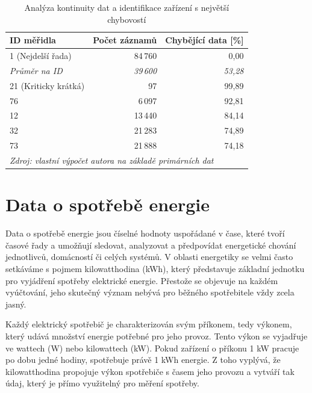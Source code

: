 \begin{table}[htbp]
\centering
\caption{Analýza kontinuity dat a identifikace zařízení s největší chybovostí}
\label{tab:vypadky_dat}
\begin{tabular}{@{}lrr@{}}
\toprule
\textbf{ID měřidla} & \textbf{Počet záznamů} & \textbf{Chybějící data [\%]} \\ \midrule
1 (Nejdelší řada)   & 84\,760               & 0,00                         \\
\textit{Průměr na ID} & \textit{39\,600}      & \textit{53,28}               \\ \midrule
21 (Kriticky krátká)& 97                    & 99,89                        \\
76                  & 6\,097                & 92,81                        \\
12                  & 13\,440               & 84,14                        \\
32                  & 21\,283               & 74,89                        \\
73                  & 21\,888               & 74,18                        \\ \bottomrule
\multicolumn{3}{l}{\textit{Zdroj: vlastní výpočet autora na základě primárních dat}}
\end{tabular}
\end{table}

\section{Data o spotřebě energie}
Data o spotřebě energie jsou číselné hodnoty uspořádané v čase, které tvoří časové řady a umožňují sledovat, analyzovat a předpovídat energetické chování jednotlivců, domácností či celých systémů. V oblasti energetiky se velmi často setkáváme s pojmem kilowatthodina (kWh), který představuje základní jednotku pro vyjádření spotřeby elektrické energie. Přestože se objevuje na každém vyúčtování, jeho skutečný význam nebývá pro běžného spotřebitele vždy zcela jasný.

Každý elektrický spotřebič je charakterizován svým příkonem, tedy výkonem, který udává množství energie potřebné pro jeho provoz. 
Tento výkon se vyjadřuje ve wattech (W) nebo kilowattech (kW). Pokud zařízení o příkonu 1 kW pracuje po dobu jedné hodiny, spotřebuje právě 1 kWh energie. Z toho vyplývá, že kilowatthodina propojuje výkon spotřebiče s časem jeho provozu a vytváří tak údaj, který je přímo využitelný pro měření spotřeby.

